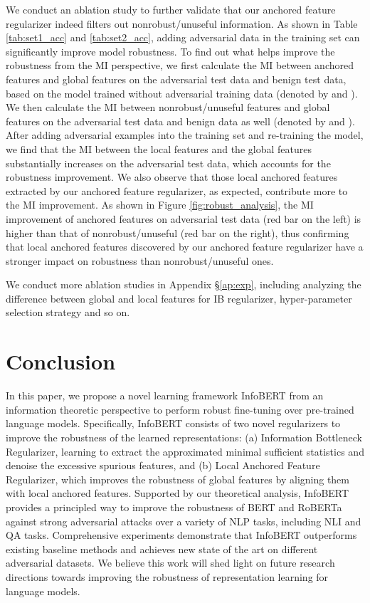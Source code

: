 \documentclass{article} \usepackage{iclr2021_conference,times}
\theoremstyle{definition}
\theoremstyle{remark}
\newcommand{\method}{InfoBERT\xspace}
\newcommand{\modified}[1]{{\color{black}{#1}}}
\begin{document}
We conduct an ablation study to further validate that our anchored feature regularizer indeed filters out nonrobust/unuseful information. As shown in Table \ref{tab:set1_acc}  and \ref{tab:set2_acc}, adding adversarial data in the training set can significantly improve model robustness. To find out what helps improve the robustness from the MI perspective, we first calculate the MI between anchored features and global features  on the adversarial test data and benign test data, based on the model trained without adversarial training data (denoted by  and ). We then calculate the MI between nonrobust/unuseful features and global features  on the adversarial test data and benign data as well (denoted by  and ). After adding adversarial examples into the training set and re-training the model, we find that the MI between the local features and the global features substantially increases on the adversarial test data, which accounts for the robustness improvement. We also observe that those local anchored features extracted by our anchored feature regularizer, as expected, contribute more to the MI improvement. As shown in Figure \ref{fig:robust_analysis}, the MI improvement of anchored features on adversarial test data  (red bar on the left) is higher than that of nonrobust/unuseful  (red bar on the right), thus confirming that local anchored features discovered by our anchored feature regularizer 
have a stronger impact on robustness than nonrobust/unuseful ones. 

We conduct more ablation studies in Appendix \S\ref{ap:exp}, including analyzing \modified{the individual impact of two regularizers,} the difference between global and local features for IB regularizer, hyper-parameter selection strategy and so on.


 \section{Conclusion}
In this paper, we propose a novel learning framework \method from an information theoretic perspective to perform robust fine-tuning over pre-trained language models. Specifically, InfoBERT consists of two novel regularizers to improve the robustness of the learned representations: (a) Information Bottleneck Regularizer, learning to extract the approximated minimal sufficient statistics and denoise the excessive spurious features, and (b) Local Anchored Feature Regularizer, which improves the robustness of global features by aligning them with local anchored features.  Supported by our theoretical analysis, \method provides a principled way to improve the robustness of BERT and RoBERTa against strong adversarial attacks over a variety of NLP tasks, including NLI and QA tasks. Comprehensive experiments demonstrate that \method outperforms existing baseline methods and achieves new state of the art on different adversarial datasets. We believe this work will shed light on future research directions towards improving the robustness of representation learning for language models. 
\end{document}
